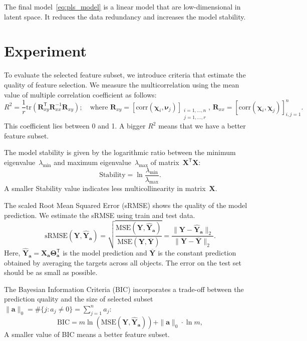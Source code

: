 \documentclass[preprint,authoryear,12pt]{elsarticle}
\theoremstyle{definition}
\newcommand{\ba}{\mathbf{a}}
\newcommand{\bY}{\mathbf{Y}}
\newcommand{\bX}{\mathbf{X}}
\newcommand{\T}{\mathsf{T}}
\newcommand{\bchi}{\boldsymbol{\chi}}
\newcommand{\bnu}{\boldsymbol{\nu}}
\newcommand{\bTheta}{\boldsymbol{\Theta}}
\begin{document}
The final model~\eqref{eq:pls_model} is a linear model that are low-dimensional in latent space. 
It reduces the data redundancy and increases the model stability. 

\section{Experiment}

To evaluate the selected feature subset, we introduce criteria that estimate the quality of feature selection.
We measure the multicorrelation using the mean value of multiple correlation coefficient as follows:
\begin{equation*}
R^2 = \frac{1}{r} \text{tr} \left( \mathbf{R}_{xy}^{\T} \mathbf{R}_{xx}^{-1} \mathbf{R}_{xy} \right); \quad \text{where } \mathbf{R}_{xy} = [ \text{corr}(\bchi_i, \bnu_j)]_{\substack{i=1, \dots, n \\ j=1, \dots, r}}, \, \mathbf{R}_{xx} = [ \text{corr}(\bchi_i, \bchi_j)]_{i, j = 1}^n.
\end{equation*}
This coefficient lies between 0 and 1. A bigger $R^2$ means that we have a better feature subset.

The model stability is given by the logarithmic ratio between the minimum eigenvalue~$\lambda_{\min}$ and maximum eigenvalue~$\lambda_{\max}$ of matrix~$\bX^{\T} \bX$:
\begin{equation*}
\text{Stability} = \ln \frac{\lambda_{\min}}{\lambda_{\max}}.
\end{equation*}
A smaller Stability value indicates less multicollinearity in matrix~$\bX$.

The scaled Root Mean Squared Error (sRMSE) shows the quality of the model prediction. We estimate the sRMSE using train and test data.
\begin{equation*}
\text{sRMSE}(\bY, \widehat{\bY}_{\ba}) = \sqrt{\frac{\text{MSE} (\bY, \widehat{\bY}_{\ba})}{\text{MSE} (\bY, \overline{\bY})}} =  \frac{\| \bY - \widehat{\bY}_{\ba} \|_2}{\| \bY - \overline{\bY} \|_2}.
\end{equation*}
Here, $\widehat{\bY}_{\ba} = \bX_{\ba} \bTheta_{\ba}^{\T}$ is the model prediction and $\overline{\bY}$ is the constant prediction obtained by averaging the targets across all objects.
The error on the test set should be as small as possible.

The Bayesian Information Criteria (BIC) incorporates a trade-off between the prediction quality and the size of selected subset~$\|\ba\|_0 = \#\{j: a_j \neq 0\}= \sum_{j=1}^n a_j$:
\begin{equation*}
\text{BIC} = m \ln \left( \text{MSE} ( \bY, \widehat{\bY}_{\ba})\right) + \| \ba \|_0 \cdot \ln m,
\end{equation*}
A smaller value of BIC means a better feature subset.
\end{document}
